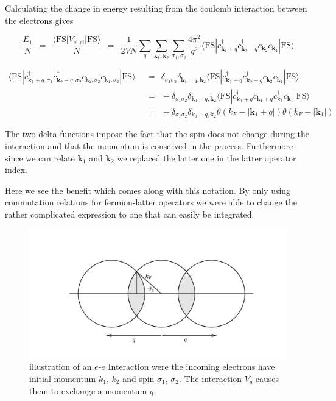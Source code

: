 \documentclass[10pt]{report}
\numberwithin{equation}{chapter}
\begin{document}
Calculating the change in energy resulting from the coulomb interaction between the electrons gives

\begin{equation}
  \frac{E_1}{N} ~~=~~ \frac{\langle \text{FS} | V_\text{el-el} | \text{FS} \rangle}{N} 
  ~~=~~ \frac{1}{2VN} \sum_q \sum_{\mathbf{k}_1, \mathbf{k}_2} \sum_{\sigma_1, \sigma_2}
  \frac{4\pi^2}{q^2} 
  \langle \text{FS} | c^\dag_{\mathbf{k}_1+q} c^\dag_{\mathbf{k}_2-q} c_{\mathbf{k}_2} c_{\mathbf{k}_1} | \text{FS} \rangle  
\end{equation}

\begin{align}
  \langle \text{FS} | c^\dag_{\mathbf{k}_1+q, \sigma_1} c^\dag_{\mathbf{k}_2-q, \sigma_2} c_{\mathbf{k}_2, \sigma_2} c_{\mathbf{k}_1, \sigma_2} | \text{FS} \rangle 
  ~~& =~~ \delta_{\sigma_1 \sigma_2} \delta_{\mathbf{k}_1+q, \mathbf{k}_2} 
  \langle \text{FS} | c^\dag_{\mathbf{k}_1+q} c^\dag_{\mathbf{k}_2-q} c_{\mathbf{k}_2} c_{\mathbf{k}_1} | \text{FS} \rangle \nonumber \\
  ~~& =~~ -\delta_{\sigma_1 \sigma_2} \delta_{\mathbf{k}_1+q, \mathbf{k}_2} 
  \langle \text{FS} | c^\dag_{\mathbf{k}_1+q} c_{\mathbf{k}_1+q} c^\dag_{\mathbf{k}_1} c_{\mathbf{k}_1} | \text{FS} \rangle \nonumber \\
  ~~& =~~ -\delta_{\sigma_1 \sigma_2} \delta_{\mathbf{k}_1+q, \mathbf{k}_2}
  \theta(k_F - |\mathbf{k}_1+q |) \theta(k_F - | \mathbf{k}_1|)
\end{align}


The two delta functions impose the fact that the spin does not change during the interaction and that the momentum is conserved in the process. Furthermore since we can relate $\mathbf{k}_1$ and $\mathbf{k}_2$ we replaced the latter one in the latter operator index.

Here we see the benefit which comes along with this notation. By only using commutation relations for fermion-latter operators we were able to change the rather complicated expression to one that can easily be integrated.


\begin{figure}
  \centering
  \includegraphics[width=1.0\textwidth]{../img/sq_graph_integration.pdf}
  \caption{illustration of an $e$-$e$ Interaction were the incoming electrons have initial momentum $k_1$, $k_2$ and spin $\sigma_1$, $\sigma_2$. The interaction $V_q$ causes them to exchange a momentum $q$.}
  \label{fig:sq_graph_integration}
\end{figure}
\end{document}
